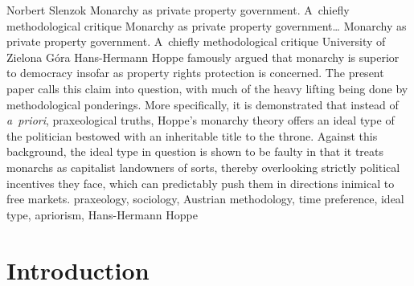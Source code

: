 \begin{artengenv}{Norbert Slenzok}
	{Monarchy as private property government. A~chiefly methodological critique}
	{Monarchy as private property government\ldots}
	{Monarchy as private property government. A~chiefly methodological critique}
	{University of Zielona Góra}
	{Hans-Hermann Hoppe famously argued that monarchy is superior to democracy insofar as property rights protection is concerned. The present paper calls this claim into question, with much of the heavy lifting being done by methodological ponderings. More specifically, it is demonstrated that instead of \textit{a~priori}, praxeological truths, Hoppe's monarchy theory offers an ideal type of the politician bestowed with an inheritable title to the throne. Against this background, the ideal type in question is shown to be faulty in that it treats monarchs as capitalist landowners of sorts, thereby overlooking strictly political incentives they face, which can predictably push them in directions inimical to free markets.
	}
	{praxeology, sociology, Austrian methodology, time preference, ideal type, apriorism, Hans-Hermann Hoppe}








\section{Introduction}


\end{artengenv}

